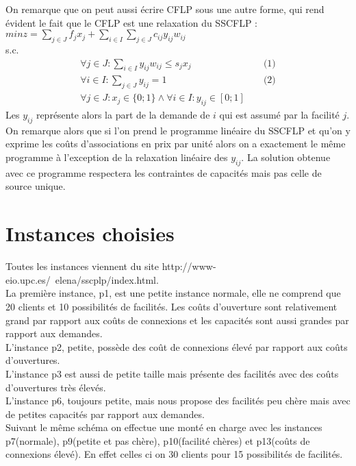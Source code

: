 \documentclass[12pt,a4paper]{article}
\begin{document}
On remarque que on peut aussi écrire CFLP sous une autre forme, qui rend évident le fait que le CFLP est une relaxation du SSCFLP :\\
$min z = \sum \limits_{j \in J} f_j x_j + \sum \limits_{i \in I} \sum \limits_{j \in J} c_{ij} y_{ij} w_{ij}$\\
s.c.
\begin{align*}
 \forall j \in J : \sum \limits_{i \in I} y_{ij} w_{ij} \leqslant s_j x_j & & \text{ (1)} \\
 \forall i \in I : \sum \limits_{j \in J} y_{ij} = 1 & & \text{ (2)} \\
 \forall j \in J : x_j \in \{0;1\} \land \forall i \in I : y_{ij} \in \left[ 0;1 \right]
\end{align*}
Les  $y_{ij}$ représente alors la part de la demande de $i$ qui est assumé par la facilité $j$. On remarque alors que si l'on prend le programme linéaire du SSCFLP et qu'on y exprime les coûts d'associations en prix par unité alors on a exactement le même programme à l’exception de la relaxation linéaire des $y_{ij}$. La solution obtenue avec ce programme respectera les contraintes de capacités mais pas celle de source unique.

\section{Instances choisies}

Toutes les instances viennent du site http://www-eio.upc.es/~elena/sscplp/index.html.\\

La première instance, p1, est une petite instance normale, elle ne comprend que 20 clients et 10 possibilités de facilités. Les coûts d'ouverture sont relativement grand par rapport aux coûts de connexions et les capacités sont aussi grandes par rapport aux demandes.\\

L'instance p2, petite, possède des coût de connexions élevé par rapport aux coûts d'ouvertures.\\

L'instance p3 est aussi de petite taille mais présente des facilités avec des coûts d'ouvertures très élevés.\\

L'instance p6, toujours petite, mais nous propose des facilités peu chère mais avec de petites capacités par rapport aux demandes.\\

Suivant le même schéma on effectue une monté en charge avec les instances p7(normale), p9(petite et pas chère), p10(facilité chères) et p13(coûts de connexions élevé). En effet celles ci on 30 clients pour 15 possibilités de facilités.\\
\end{document}
